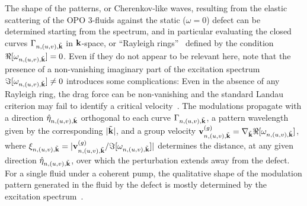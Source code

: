 The shape of the patterns, or Cherenkov-like waves, resulting from the
elastic scattering of the OPO 3-fluids against the static ($\omega=0$)
defect can be determined starting from the spectrum, and in particular
evaluating the closed curves $\Gamma_{n,(u,v), \tilde{\mathbf{k}}}$ in
$\mathbf{k}$-space, or ``Rayleigh rings''~\cite{9783319002651} defined by
the condition $\Re[\omega_{n,(u,v), \tilde{\mathbf{k}}}] = 0$. Even if
they do not appear to be relevant here, note that the presence of a
non-vanishing imaginary part of the excitation spectrum
$\Im[\omega_{n,(u,v),\tilde{\mathbf{k}}}]\neq 0$ introduces some
complications: Even in the absence of any Rayleigh ring, the drag
force can be non-vanishing and the standard Landau criterion may fail
to identify a critical velocity~\cite{Wouters_2010}.
%
The modulations propagate with a direction
$\hat{\eta}_{n,(u,v),\tilde{\mathbf{k}}}$ orthogonal to each curve
$\Gamma_{n,(u,v), \tilde{\mathbf{k}}}$, a pattern wavelength given by
the corresponding $|\tilde{\mathbf{k}}|$, and a group velocity
$\mathbf{v}_{n,(u,v),\tilde{\mathbf{k}}}^{(g)}=\nabla_{\tilde{\mathbf{k}}}
\Re[\omega_{n,(u,v), \tilde{\mathbf{k}}}]$, where
$\xi_{n,(u,v),\tilde{\mathbf{k}}} =
|\mathbf{v}_{n,(u,v),\tilde{\mathbf{k}}}^{(g)} / \Im[\omega_{n,(u,v),
  \tilde{\mathbf{k}}}]|$ determines the distance, at any given direction
$\hat{\eta}_{n,(u,v),\tilde{\mathbf{k}}}$, over which the perturbation
extends away from the defect. For a single fluid under a coherent
pump, the qualitative shape of the modulation pattern generated in the
fluid by the defect is mostly determined by the excitation
spectrum~\cite{Carusotto_2006,Carusotto_2004}.


